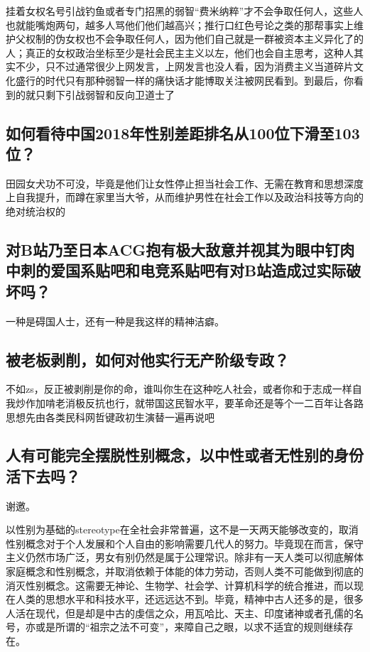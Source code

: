 \documentclass{ctexart}
\begin{document}
	挂着女权名号引战钓鱼或者专门招黑的弱智“费米纳粹”才不会争取任何人，这些人也就能嘴炮两句，越多人骂他们他们越高兴；推行口红色号论之类的那帮事实上维护父权制的伪女权也不会争取任何人，因为他们自己就是一群被资本主义异化了的人；真正的女权政治坐标至少是社会民主主义以左，他们也会自主思考，这种人其实不少，只不过通常很少上网发言，上网发言也没人看，因为消费主义当道碎片文化盛行的时代只有那种弱智一样的痛快话才能博取关注被网民看到。到最后，你看到的就只剩下引战弱智和反向卫道士了
	
	\subsection{如何看待中国2018年性别差距排名从100位下滑至103位？}
	
	田园女犬功不可没，毕竟是他们让女性停止担当社会工作、无需在教育和思想深度上自我提升，而蹲在家里当大爷，从而维护男性在社会工作以及政治科技等方向的绝对统治权的
	
	\subsection{对B站乃至日本ACG抱有极大敌意并视其为眼中钉肉中刺的爱国系贴吧和电竞系贴吧有对B站造成过实际破坏吗？}
	
	一种是碍国人士，还有一种是我这样的精神洁癖。
	
	\subsection{被老板剥削，如何对他实行无产阶级专政？}
	
	不如zs，反正被剥削是你的命，谁叫你生在这种吃人社会，或者你和于志成一样自我炒作加啃老消极反抗也行，就带国这民智水平，要革命还是等个一二百年让各路思想先由各类民科网哲键政初生演替一遍再说吧
	
	\subsection{人有可能完全摆脱性别概念，以中性或者无性别的身份活下去吗？}
	
	谢邀。
	
	以性别为基础的stereotype在全社会非常普遍，这不是一天两天能够改变的，取消性别概念对于个人发展和个人自由的影响需要几代人的努力。毕竟现在而言，保守主义仍然市场广泛，男女有别仍然是属于公理常识。除非有一天人类可以彻底解体家庭概念和性别概念，并取消依赖于体能的体力劳动，否则人类不可能做到彻底的消灭性别概念。这需要无神论、生物学、社会学、计算机科学的统合推进，而以现在人类的思想水平和科技水平，还远远达不到。毕竟，精神中古人还多的是，很多人活在现代，但是却是中古的虔信之众，用瓦哈比、天主、印度诸神或者孔儒的名号，亦或是所谓的“祖宗之法不可变”，来障自己之眼，以求不适宜的规则继续存在。
	
\end{document}
